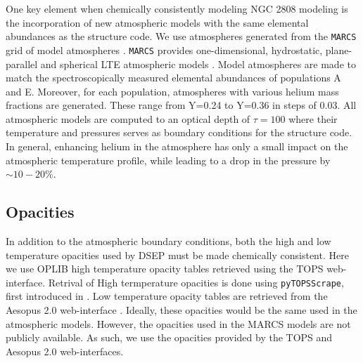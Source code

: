 One key element when chemically consistently modeling NGC 2808 modeling is the
incorporation of new atmospheric models with the same elemental abundances as
the structure code. We use atmospheres generated from the \texttt{MARCS} grid
of model atmospheres \citep{Plez2008}. \texttt{MARCS} provides one-dimensional,
hydrostatic, plane-parallel and spherical LTE atmospheric models
\citep{Gustafsson2008}. Model atmospheres are made to match the
spectroscopically measured elemental abundances of populations A and E.
Moreover, for each population, atmospheres with various helium mass fractions
are generated. These range from Y=0.24 to Y=0.36 in steps of 0.03. All
atmospheric models are computed to an optical depth of $\tau = 100$ where their
temperature and pressures serves as boundary conditions for the structure code.
In general, enhancing helium in the atmosphere has only a small impact on the atmospheric
temperature profile, while leading to a drop in the pressure by $\sim 10 - 20 \%$.

\subsection{Opacities}\label{sec:opac}
In addition to the atmospheric boundary conditions, both the high and low
temperature opacities used by DSEP must be made chemically consistent. Here we
use OPLIB high temperature opacity tables \citep{Colgan2016} retrieved using
the TOPS web-interface. Retrival of High termperature opacities is done using
\texttt{pyTOPSScrape}, first introduced in \citet{Boudreaux2023}. Low
temperature opacity tables are retrieved from the Aesopus 2.0 web-interface
\citep{Marigo2009, Marigo2022}. Ideally, these opacities would be the same used
in the atmospheric models. However, the opacities used in the MARCS models are
not publicly available. As such, we use the opacities provided by the TOPS and
Aesopus 2.0 web-interfaces.
